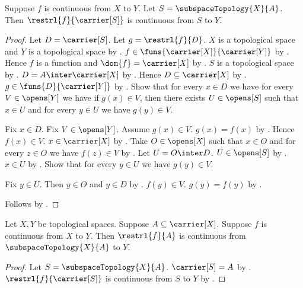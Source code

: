 \begin{theorem}\label{continuous_domain_restriction}
    Suppose $f$ is continuous from $X$ to $Y$.
    Let $S=\subspaceTopology{X}{A}$.
    Then $\restrl{f}{\carrier[S]}$ is continuous from $S$ to $Y$.
\end{theorem}
\begin{proof}
    Let $D=\carrier[S]$.
    Let $g=\restrl{f}{D}$.
    $X$ is a topological space and $Y$ is a topological space
        by .
    $f\in\funs{\carrier[X]}{\carrier[Y]}$
        by .
    Hence $f$ is a function and $\dom{f}=\carrier[X]$
        by .
    $S$ is a topological space
        by .
    $D=A\inter\carrier[X]$ by .
    Hence $D\subseteq\carrier[X]$ by .
    $g\in\funs{D}{\carrier[Y]}$ by .
    Show that for every $x\in D$ we have
        for every $V\in\opens[Y]$ we have if $g(x)\in V$, then
        there exists $U\in\opens[S]$ such that $x\in U$ and
            for every $y\in U$ we have $g(y)\in V$.
    \begin{subproof}
        Fix $x\in D$.
        Fix $V\in\opens[Y]$.
        Assume $g(x)\in V$.
        $g(x)=f(x)$ by .
        Hence $f(x)\in V$.
        $x\in\carrier[X]$ by .
        Take $O\in\opens[X]$ such that $x\in O$ and
            for every $z\in O$ we have $f(z)\in V$
            by .
        Let $U=O\inter D$.
        $U\in\opens[S]$ by .
        $x\in U$ by .
        Show that for every $y\in U$ we have $g(y)\in V$.
        \begin{subproof}
            Fix $y\in U$.
            Then $y\in O$ and $y\in D$ by .
            $f(y)\in V$.
            $g(y)=f(y)$
                by .
        \end{subproof}
    \end{subproof}
    Follows by .
\end{proof}

\begin{theorem}\label{continuous_domain_restriction_on_subset}
    Let $X,Y$ be topological spaces.
    Suppose $A\subseteq\carrier[X]$.
    Suppose $f$ is continuous from $X$ to $Y$.
    Then $\restrl{f}{A}$ is continuous from
        $\subspaceTopology{X}{A}$ to $Y$.
\end{theorem}
\begin{proof}
    Let $S=\subspaceTopology{X}{A}$.
    $\carrier[S]=A$ by .
    $\restrl{f}{\carrier[S]}$ is continuous from $S$ to $Y$
        by .
\end{proof}

